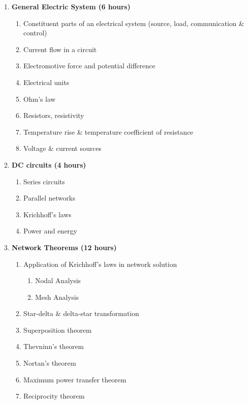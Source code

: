 \begin{enumerate}
    \item \textbf{ General Electric System \hfill (6 hours)}
    \begin{enumerate}
        \item Constituent parts of an electrical system (source, load, communication \& control)
        \item Current flow in a circuit
        \item Electromotive force and potential difference
        \item Electrical units
        \item Ohm's law
        \item Resistors, resistivity
        \item Temperature rise \& temperature coefficient of resistance
        \item Voltage \& current sources
    \end{enumerate}
    
    \item \textbf{ DC circuits \hfill (4 hours)}
    \begin{enumerate}
        \item Series circuits
        \item Parallel networks
        \item Krichhoff's laws
        \item Power and energy
    \end{enumerate}
    
    \item \textbf{ Network Theorems \hfill (12 hours)}
    \begin{enumerate}
        \item Application of Krichhoff's laws in network solution
        \begin{enumerate}
            \item Nodal Analysis
            \item Mesh Analysis
        \end{enumerate}
        \item Star-delta \& delta-star transformation
        \item Superposition theorem
        \item Thevninn's theorem
        \item Nortan's theorem
        \item Maximum power transfer theorem
        \item Reciprocity theorem
    \end{enumerate}
    

\end{enumerate}
